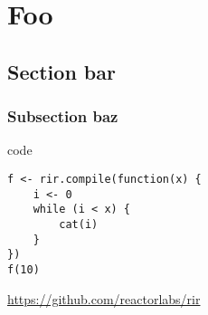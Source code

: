 \chapter{Foo \label{foo}}

\blind[2]

\section{Section bar}\label{bar}

\blind[2]

\subsection{Subsection baz}\label{baz}

\blind[2]

\begin{listing}[htbp]
\caption{\label{xxx}code}
\begin{verbatim}
f <- rir.compile(function(x) {
    i <- 0
    while (i < x) {
        cat(i)
    }
})
f(10)
\end{verbatim}
\end{listing}

\url{https://github.com/reactorlabs/rir}
